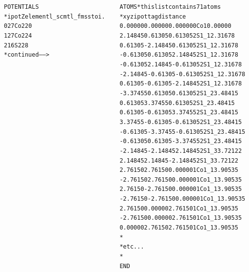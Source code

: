 \documentclass[10pt, xcolor=x11names, compress]{beamer}
\begin{document}
\begin{frame}[fragile]
\begin{columns}[T]
\begin{column}{0.44\linewidth}
\begin{onlyenv}
\begin{block}{}
\begin{alltt}
 {\color{Brown4}POTENTIALS}
 {\color{Blue4}*   ipot  Z  element  l\_scmt  l\_fms  stoi.}
        0   27   Co       2       2       0
        1   27   Co       2       2       4
        2   16   S        2       2       8
                          {\color{Blue4}* continued ------>}
          \end{alltt}
        \end{block}
      \end{onlyenv}
     \end{column}
     \begin{column}{0.54\linewidth}
      \begin{block}{}
         \begin{alltt}
         \tiny
  {\color{Brown4}ATOMS}   {\color{Blue4}* this list contains 71 atoms
  *   x          y          z     ipot  tag     distance}
     0.00000    0.00000    0.00000  0  Co1     0.00000
     2.14845    0.61305    0.61305  2  S1\_1    2.31678
     0.61305   -2.14845    0.61305  2  S1\_1    2.31678
    -0.61305    0.61305    2.14845  2  S1\_1    2.31678
    -0.61305    2.14845   -0.61305  2  S1\_1    2.31678
    -2.14845   -0.61305   -0.61305  2  S1\_1    2.31678
     0.61305   -0.61305   -2.14845  2  S1\_1    2.31678
    -3.37455    0.61305    0.61305  2  S1\_2    3.48415
     0.61305    3.37455    0.61305  2  S1\_2    3.48415
     0.61305   -0.61305    3.37455  2  S1\_2    3.48415
     3.37455   -0.61305   -0.61305  2  S1\_2    3.48415
    -0.61305   -3.37455   -0.61305  2  S1\_2    3.48415
    -0.61305    0.61305   -3.37455  2  S1\_2    3.48415
    -2.14845   -2.14845    2.14845  2  S1\_3    3.72122
     2.14845    2.14845   -2.14845  2  S1\_3    3.72122
     2.76150    2.76150    0.00000  1  Co1\_1   3.90535
    -2.76150    2.76150    0.00000  1  Co1\_1   3.90535
     2.76150   -2.76150    0.00000  1  Co1\_1   3.90535
    -2.76150   -2.76150    0.00000  1  Co1\_1   3.90535
     2.76150    0.00000    2.76150  1  Co1\_1   3.90535
    -2.76150    0.00000    2.76150  1  Co1\_1   3.90535
     0.00000    2.76150    2.76150  1  Co1\_1   3.90535
  {\color{Blue4}*
  * etc...
  *}
  {\color{Purple2}END}
         \end{alltt}
       \end{block}
     \end{column}
   \end{columns}
\end{frame}
\end{document}
